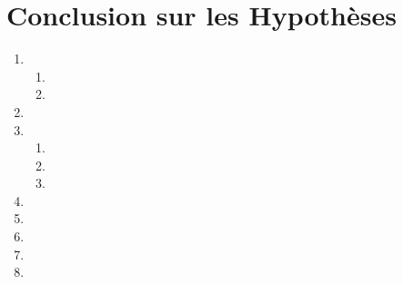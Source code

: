 \documentclass[12pt]{article}
\begin{document}
\section{Conclusion sur les Hypothèses}

\begin{enumerate}
    \item 
    \begin{enumerate}
        \item 
        \item 
    \end{enumerate}

    \item 

    \item    
    \begin{enumerate}
        \item 
        \item
        \item
    \end{enumerate}

    \item

    \item 

    \item 

    \item

    \item

\end{enumerate}
\end{document}
